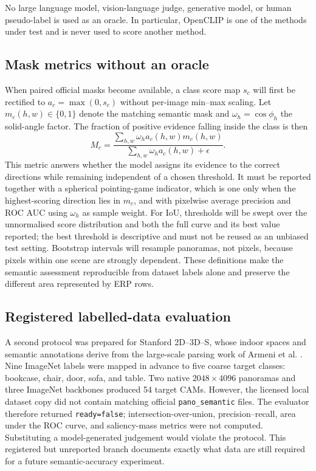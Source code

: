 \documentclass{isprs}
\begin{document}
No large language model, vision-language judge, generative model, or human
pseudo-label is used as an oracle.  In particular, OpenCLIP is one of the
methods under test and is never used to score another method.

\subsection{Mask metrics without an oracle}

When paired official masks become available, a class score map $s_c$ will first
be rectified to $a_c=\max(0,s_c)$ without per-image min--max scaling.  Let
$m_c(h,w)\in\{0,1\}$ denote the matching semantic mask and
$\omega_h=\cos\phi_h$ the solid-angle factor.  The fraction of positive
evidence falling inside the class is then
\begin{equation}
 M_c=\frac{\sum_{h,w}\omega_h a_c(h,w)m_c(h,w)}
            {\sum_{h,w}\omega_h a_c(h,w)+\epsilon}.
 \label{eq:mass}
\end{equation}
This metric answers whether the model assigns its evidence to the correct
directions while remaining independent of a chosen threshold.  It must be
reported together with a spherical pointing-game indicator, which is one only
when the highest-scoring direction lies in $m_c$, and with pixelwise average
precision and ROC AUC using $\omega_h$ as sample weight.  For IoU, thresholds
will be swept over the unnormalised score distribution and both the full curve
and its best value reported; the best threshold is descriptive and must not be
reused as an unbiased test setting.  Bootstrap intervals will resample
panoramas, not pixels, because pixels within one scene are strongly dependent.
These definitions make the semantic assessment reproducible from dataset
labels alone and preserve the different area represented by ERP rows.

\subsection{Registered labelled-data evaluation}

A second protocol was prepared for Stanford 2D--3D--S, whose indoor spaces and
semantic annotations derive from the large-scale parsing work of Armeni et al.
\cite{armeni2016stanford}.  Nine ImageNet labels were mapped in advance to five
coarse target classes: bookcase, chair, door, sofa, and table.  Two native
$2048\!\times\!4096$ panoramas and three ImageNet backbones produced 54 target
CAMs.  However, the licensed local dataset copy did not contain matching
official \texttt{pano\_semantic} files.  The evaluator therefore returned
\texttt{ready=false}; intersection-over-union, precision--recall, area under
the ROC curve, and saliency-mass metrics were not computed.  Substituting a
model-generated judgement would violate the protocol.  This registered but
unreported branch documents exactly what data are still required for a future
semantic-accuracy experiment.
\end{document}
